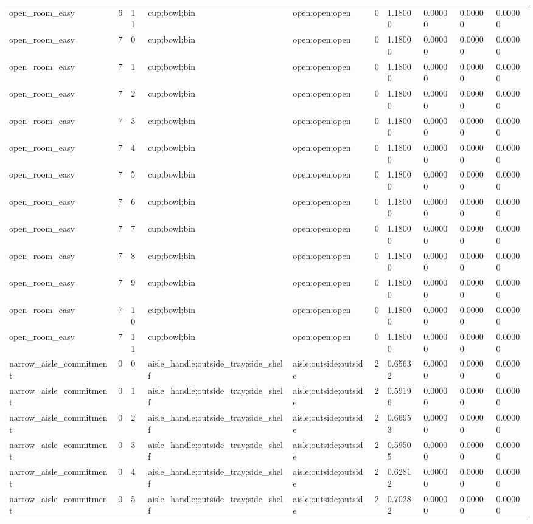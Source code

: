 \documentclass{article}
\begin{document}
\begin{table}[tbp]
{\begin{tabular}{llllllllll}
open\_room\_easy & 6 & 11 & cup;bowl;bin & open;open;open & 0 & 1.18000 & 0.00000 & 0.00000 & 0.00000 \\
open\_room\_easy & 7 & 0 & cup;bowl;bin & open;open;open & 0 & 1.18000 & 0.00000 & 0.00000 & 0.00000 \\
open\_room\_easy & 7 & 1 & cup;bowl;bin & open;open;open & 0 & 1.18000 & 0.00000 & 0.00000 & 0.00000 \\
open\_room\_easy & 7 & 2 & cup;bowl;bin & open;open;open & 0 & 1.18000 & 0.00000 & 0.00000 & 0.00000 \\
open\_room\_easy & 7 & 3 & cup;bowl;bin & open;open;open & 0 & 1.18000 & 0.00000 & 0.00000 & 0.00000 \\
open\_room\_easy & 7 & 4 & cup;bowl;bin & open;open;open & 0 & 1.18000 & 0.00000 & 0.00000 & 0.00000 \\
open\_room\_easy & 7 & 5 & cup;bowl;bin & open;open;open & 0 & 1.18000 & 0.00000 & 0.00000 & 0.00000 \\
open\_room\_easy & 7 & 6 & cup;bowl;bin & open;open;open & 0 & 1.18000 & 0.00000 & 0.00000 & 0.00000 \\
open\_room\_easy & 7 & 7 & cup;bowl;bin & open;open;open & 0 & 1.18000 & 0.00000 & 0.00000 & 0.00000 \\
open\_room\_easy & 7 & 8 & cup;bowl;bin & open;open;open & 0 & 1.18000 & 0.00000 & 0.00000 & 0.00000 \\
open\_room\_easy & 7 & 9 & cup;bowl;bin & open;open;open & 0 & 1.18000 & 0.00000 & 0.00000 & 0.00000 \\
open\_room\_easy & 7 & 10 & cup;bowl;bin & open;open;open & 0 & 1.18000 & 0.00000 & 0.00000 & 0.00000 \\
open\_room\_easy & 7 & 11 & cup;bowl;bin & open;open;open & 0 & 1.18000 & 0.00000 & 0.00000 & 0.00000 \\
narrow\_aisle\_commitment & 0 & 0 & aisle\_handle;outside\_tray;side\_shelf & aisle;outside;outside & 2 & 0.65632 & 0.00000 & 0.00000 & 0.00000 \\
narrow\_aisle\_commitment & 0 & 1 & aisle\_handle;outside\_tray;side\_shelf & aisle;outside;outside & 2 & 0.59196 & 0.00000 & 0.00000 & 0.00000 \\
narrow\_aisle\_commitment & 0 & 2 & aisle\_handle;outside\_tray;side\_shelf & aisle;outside;outside & 2 & 0.66953 & 0.00000 & 0.00000 & 0.00000 \\
narrow\_aisle\_commitment & 0 & 3 & aisle\_handle;outside\_tray;side\_shelf & aisle;outside;outside & 2 & 0.59505 & 0.00000 & 0.00000 & 0.00000 \\
narrow\_aisle\_commitment & 0 & 4 & aisle\_handle;outside\_tray;side\_shelf & aisle;outside;outside & 2 & 0.62812 & 0.00000 & 0.00000 & 0.00000 \\
narrow\_aisle\_commitment & 0 & 5 & aisle\_handle;outside\_tray;side\_shelf & aisle;outside;outside & 2 & 0.70282 & 0.00000 & 0.00000 & 0.00000 \\
\bottomrule
\end{tabular}
}
\end{table}
\end{document}
